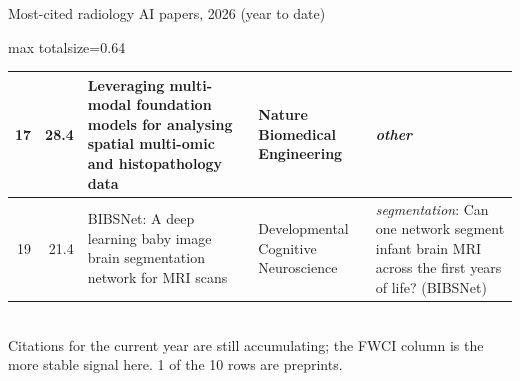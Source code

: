 \documentclass[aspectratio=169]{beamer}
\begin{document}
\begin{frame}[category=Journals/Preprints]{Most-cited radiology AI papers, 2026 (year to date)}
\begin{adjustbox}{max totalsize={\textwidth}{0.64\textheight}}
\begin{tabular}{|r|r|>{\raggedright\arraybackslash}p{}|>{\raggedright\arraybackslash}p{}|>{\raggedright\arraybackslash}p{}|}
17 & 28.4 & Leveraging multi-modal foundation models for analysing spatial multi-omic and histopathology data & Nature Biomedical Engineering & \textit{other} \\ \hline
19 & 21.4 & BIBSNet: A deep learning baby image brain segmentation network for MRI scans & Developmental Cognitive Neuroscience & \textit{segmentation}: Can one network segment infant brain MRI across the first years of life? (BIBSNet) \\ \hline
\end{tabular}
\end{adjustbox}
\\[1pt]
{\tiny Citations for the current year are still accumulating; the FWCI column is the more stable signal here. 1 of the 10 rows are preprints.}
\end{frame}
\end{document}
